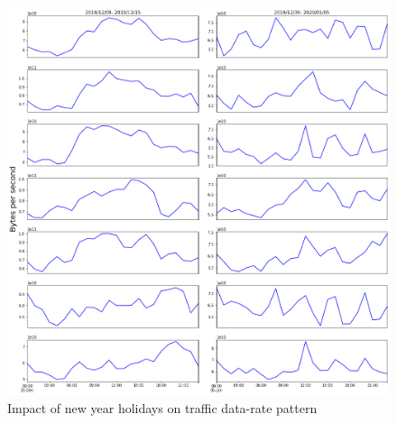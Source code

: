 \documentclass[10pt, journal, letterpaper]{IEEEtran}
\begin{document}
\begin{figure}
    \centering
    \includegraphics[width=\columnwidth]{img/BCH2_CH2_hourly_compare.png}
    \caption{Impact of new year holidays on traffic data-rate pattern}
    \label{fig:my_label}
\end{figure}
\end{document}
